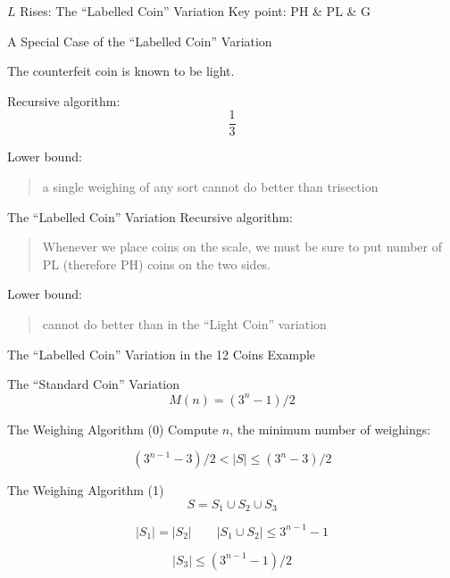 \begin{frame}{$L$ Rises: The ``Labelled Coin'' Variation}
  Key point: PH \& PL \& G

\end{frame}

\begin{frame}{A Special Case of the ``Labelled Coin'' Variation}
  \centerline{The counterfeit coin is known to be light.}

  Recursive algorithm: 
  \[
    \frac{1}{3}
  \]

  Lower bound: 
  \begin{quote}
    a single weighing of any sort cannot do better than trisection
  \end{quote}
\end{frame}

\begin{frame}{The ``Labelled Coin'' Variation}
  Recursive algorithm:
  \begin{quote}
    Whenever we place coins on the scale, 
    we must be sure to put  number of PL (therefore PH) coins on the two sides.
  \end{quote}

  Lower bound:
  \begin{quote}
    cannot do better than in the ``Light Coin'' variation
  \end{quote}
\end{frame}

\begin{frame}{The ``Labelled Coin'' Variation in the 12 Coins Example}
\end{frame}

\begin{frame}{The ``Standard Coin'' Variation}
  \[
    M(n) = (3^n - 1) / 2
  \]
\end{frame}

\begin{frame}{The Weighing Algorithm (0)}
  Compute $n$, the minimum number of weighings:

  \[
    (3^{n-1} - 3) / 2 < |S| \le (3^n - 3) / 2
  \]
\end{frame}

\begin{frame}{The Weighing Algorithm (1)}
  \[
    S = S_1 \cup S_2 \cup S_3
  \]

  \[
    |S_1| = |S_2| \qquad |S_1 \cup S_2| \le 3^{n-1} - 1 
  \]

  \[
    |S_3| \le (3^{n-1} - 1) / 2
  \]
\end{frame}

